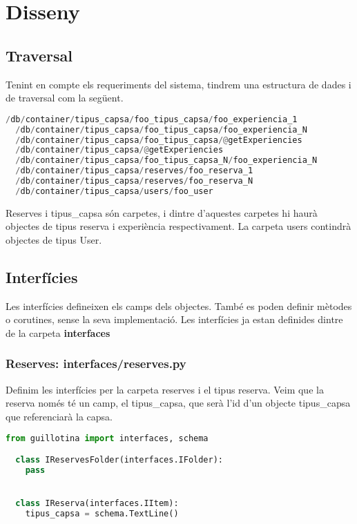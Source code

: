 \documentclass[a4paper, 11pt]{article}
\begin{document}
\section{Disseny}
\subsection{Traversal} 
Tenint en compte els requeriments del sistema, tindrem una estructura
de dades i de traversal com la següent.
\begin{lstlisting}[language=Python, caption=Estructura dades]
  /db/container/tipus_capsa/foo_tipus_capsa/foo_experiencia_1
  /db/container/tipus_capsa/foo_tipus_capsa/foo_experiencia_N
  /db/container/tipus_capsa/foo_tipus_capsa/@getExperiencies
  /db/container/tipus_capsa/@getExperiencies
  /db/container/tipus_capsa/foo_tipus_capsa_N/foo_experiencia_N
  /db/container/tipus_capsa/reserves/foo_reserva_1
  /db/container/tipus_capsa/reserves/foo_reserva_N
  /db/container/tipus_capsa/users/foo_user
\end{lstlisting}

Reserves i tipus\_capsa són carpetes, i dintre d'aquestes carpetes hi
haurà objectes de tipus reserva i experiència respectivament. La
carpeta users contindrà objectes de tipus User.

\subsection{Interfícies}
Les interfícies defineixen els camps dels objectes. També es poden
definir mètodes o corutines, sense la seva implementació. Les
interfícies ja estan definides dintre de la carpeta
\textbf{interfaces}

\subsubsection{Reserves: interfaces/reserves.py}
Definim les interfícies per la carpeta reserves i el tipus
reserva. Veim que la reserva només té un camp, el tipus\_capsa, que
serà l'id d'un objecte tipus\_capsa que referenciarà la capsa.
\begin{lstlisting}[language=Python, caption=Estructura dades]
  from guillotina import interfaces, schema

  class IReservesFolder(interfaces.IFolder):
    pass


  class IReserva(interfaces.IItem):
    tipus_capsa = schema.TextLine()
  \end{lstlisting}
\end{document}
